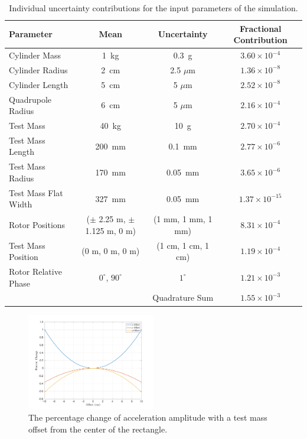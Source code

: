 \documentclass[superscriptaddress, twocolumn, prd]{revtex4-1}
\begin{document}
\begin{widetext}
\begingroup
\setlength{\tabcolsep}{10pt} %
\renewcommand{\arraystretch}{1.5} %

\begin{table}[h!]
\begin{center}
\begin{tabular}{ |l|c|c|c| }
\hline
 Parameter & Mean & Uncertainty & Fractional Contribution\\
 \hline
Cylinder Mass & 1~kg & 0.3~g & $3.60\times10^{-4}$\\
Cylinder Radius & 2~cm & 2.5 $\mu$m & $1.36\times10^{-8}$\\
Cylinder Length & 5~cm & 5 $\mu$m & $2.52\times10^{-8}$\\
Quadrupole Radius & 6~cm & 5 $\mu$m &$2.16\times10^{-4}$\\
Test Mass & 40~kg & 10~g & $2.70\times10^{-4}$\\
Test Mass Length & 200~mm & 0.1~mm& $2.77\times10^{-6}$\\
Test Mass Radius & 170~mm & 0.05~mm& $3.65\times10^{-6}$\\
Test Mass Flat Width & 327~mm & 0.05~mm&$1.37\times10^{-15}$\\
Rotor Positions & ($\pm$ 2.25 m, $\pm$ 1.125 m, 0 m) & (1 mm, 1 mm, 1 mm) &$8.31\times10^{-4}$\\
Test Mass Position & (0 m, 0 m, 0 m) & (1 cm, 1 cm, 1 cm) &$1.19\times10^{-4}$\\
Rotor Relative Phase & $0^\circ$, $90^\circ$ & $1^\circ$ & $1.21\times10^{-3}$\\
 \hline
 \hline
& &Quadrature Sum  &$1.55\times10^{-3}$\\
\hline
 \end{tabular}
 \caption{Individual uncertainty contributions for the input parameters of the simulation.}\label{uncert}
 \end{center}

\end{table}
\endgroup
\end{widetext}

\begin{figure}[!h]
\centering \includegraphics[width=0.5\textwidth]{Super4_Offset.pdf}
\caption{The percentage change of acceleration amplitude with a test mass offset from the center of the rectangle.}
\label{offset} 
\end{figure}
\end{document}

